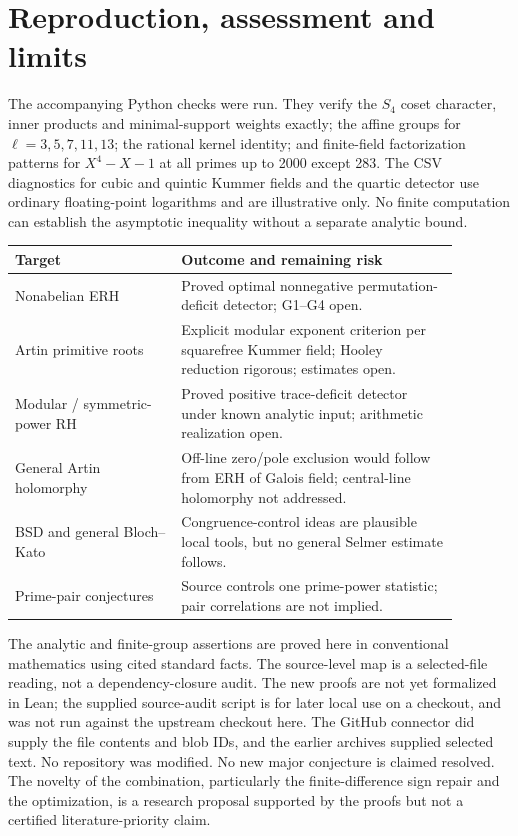 \documentclass[11pt]{article}
\theoremstyle{definition}\newtheorem{definition}[theorem]{Definition}
\begin{document}
\section{Reproduction, assessment and limits}
The accompanying Python checks were run. They verify the $S_4$ coset character, inner products and minimal-support weights exactly; the affine groups for $\ell=3,5,7,11,13$; the rational kernel identity; and finite-field factorization patterns for $X^4-X-1$ at all primes up to 2000 except 283. The CSV diagnostics for cubic and quintic Kummer fields and the quartic detector use ordinary floating-point logarithms and are illustrative only. No finite computation can establish the asymptotic inequality without a separate analytic bound.

\begin{center}\small
\begin{tabular}{p{0.33\linewidth}p{0.55\linewidth}}
\toprule
Target & Outcome and remaining risk\\\midrule
Nonabelian ERH & Proved optimal nonnegative permutation-deficit detector; G1--G4 open.\\
Artin primitive roots & Explicit modular exponent criterion per squarefree Kummer field; Hooley reduction rigorous; estimates open.\\
Modular / symmetric-power RH & Proved positive trace-deficit detector under known analytic input; arithmetic realization open.\\
General Artin holomorphy & Off-line zero/pole exclusion would follow from ERH of Galois field; central-line holomorphy not addressed.\\
BSD and general Bloch--Kato & Congruence-control ideas are plausible local tools, but no general Selmer estimate follows.\\
Prime-pair conjectures & Source controls one prime-power statistic; pair correlations are not implied.\\\bottomrule
\end{tabular}\end{center}
The analytic and finite-group assertions are proved here in conventional mathematics using cited standard facts. The source-level map is a selected-file reading, not a dependency-closure audit. The new proofs are not yet formalized in Lean; the supplied source-audit script is for later local use on a checkout, and was not run against the upstream checkout here. The GitHub connector did supply the file contents and blob IDs, and the earlier archives supplied selected text. No repository was modified. No new major conjecture is claimed resolved. The novelty of the combination, particularly the finite-difference sign repair and the optimization, is a research proposal supported by the proofs but not a certified literature-priority claim.
\end{document}
